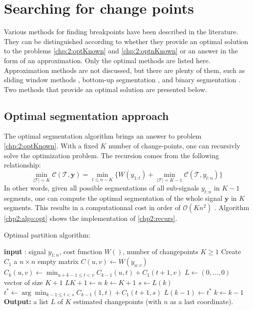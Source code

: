 \section{Searching for change points}

Various methods for finding breakpoints have been described in the literature. They can be distinguished according to whether they provide an optimal solution to the problems \ref{chp:2:optKnown} and \ref{chp:2:optnKnown} or an answer in the form of an approximation. Only the optimal methods are listed here. Approximation methods are not discussed, but there are plenty of them, such as sliding window methods \cite{Li2010,Liu2022}, bottom-up segmentation \cite{chen1998speaker}, and binary segmentation \cite{Yang2001,Fryzlewicz2014}. Two methods that provide an optimal solution are presented below.

\subsection{Optimal segmentation approach}\label{chp2:opt}

The optimal segmentation algorithm brings an answer to problem \ref{chp:2:optKnown}. With a fixed $K$ number of change-points, one can recursivly solve the optimization problem. The recursion comes from the following relationship: 
\begin{equation}\label{chp2:recurs}
\min_{\lvert\mathcal{T}\rvert = K}\mathcal{C}(\mathcal{T},\bm y) = \min_{t \leq n-K}\{W(y_{1:t})+\min_{\lvert\mathcal{T}\rvert = K-1}\mathcal{C}(\mathcal{T}, y_{t:n})\} 
\end{equation}
In other words, given all possible segmentations of all sub-signals $y_{t:n}$ in $K-1$ segments, one can compute the optimal segmentation of the whole signal $\bm y$ in $K$ segments. This results in a computationnal cost in order of $\mathcal{O}(Kn^2)$ \cite{haynes2017}. Algorithm \ref{chp2:algo:opt} shows the implementation of \ref{chp2:recurs}. 


\begin{algorithm}[ht]
\caption{Optimal partition algorithm:}\label{chp2:algo:opt}
\begin{algorithmic}

\State \textbf{input} : signal $y_{1:n}$, cost function $W()$, number of changepoints $K \geq 1$
\State Create $C_1$ a $n\times n$ empty matrix
  \State $C(u,v) \gets W(y_{u:v})$
\EndFor
{}
      \State $C_k(u,v) \gets \min_{u+k-1 \leq t < v} C_{k-1}(u,t) + C_1(t+1,v)$ 
    \EndFor
  \EndFor
\EndIf
\State $L \gets (0,...,0)$ vector of size $K+1$
\State $L{K+1} \gets n$
\State $k \gets K+1$
  \State $s \gets L(k)$
  \State $t^* \gets \arg\min_{k-1\leq t < s}C_{k-1}(1,t)+C_1(t+1,s)$
  \State $L(k-1) \gets t^*$
  \State $k \gets k-1$
\EndWhile
\State \textbf{Output:} a list $L$ of $K$ estimated changepoints (with $n$ as a last coordinate).
\end{algorithmic}
\end{algorithm} 

